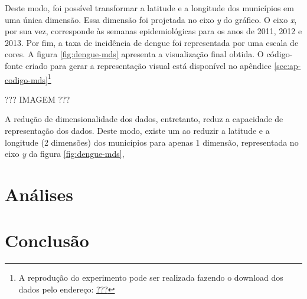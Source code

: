 \documentclass[12pt,openright,twoside,a4paper,article,brazil]{abntex2}
\begin{document}
Deste modo, foi possível transformar a latitude e a longitude dos municípios em uma única dimensão. Essa dimensão foi projetada no eixo \emph{y} do gráfico. O eixo \emph{x}, por sua vez, corresponde às semanas epidemiológicas para os anos de 2011, 2012 e 2013. Por fim, a taxa de incidência de dengue foi representada por uma escala de cores. A figura \ref{fig:dengue-mds} apresenta a visualização final obtida. O código-fonte criado para gerar a representação visual está disponível no apêndice \ref{sec:ap-codigo-mds}\footnote{A reprodução do experimento pode ser realizada fazendo o download dos dados pelo endereço: \url{???}}

??? IMAGEM ???

A redução de dimensionalidade dos dados, entretanto, reduz a capacidade de representação dos dados\cite{multidimensional-scaling-book}. Deste modo, existe um ao reduzir a latitude e a longitude (2 dimensões) dos municípios para apenas 1 dimensão, representada no eixo \emph{y} da figura \ref{fig:dengue-mds},




\section{Análises}
\label{sec:analises}



\section{Conclusão}
\label{sec:conclusao}



\backmatter

\postextual


\end{document}
